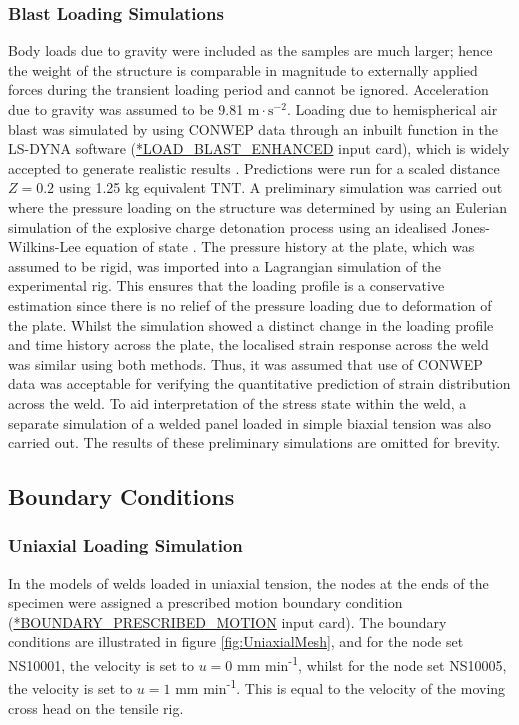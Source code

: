 \subsubsection{Blast Loading Simulations}
\label{FEBlastLoading}
Body loads due to gravity were included as the samples are much larger; hence the weight of the structure is comparable in magnitude to externally applied forces during the transient loading period and cannot be ignored. Acceleration due to gravity was assumed to be 9.81 $\text{m}\!\cdot\!\text{s}^{-2}$. 
Loading due to hemispherical air blast was simulated by using CONWEP data through an inbuilt function in the LS-DYNA software (\url{*LOAD_BLAST_ENHANCED} input card), which is widely accepted to generate realistic results \cite{Balden2005,Grujicic2007}. Predictions were run for a scaled distance $Z=0.2$ using 1.25 kg equivalent TNT. A preliminary simulation was carried out where the pressure loading on the structure was determined by using an Eulerian simulation of the explosive charge detonation process using an idealised Jones-Wilkins-Lee equation of state \cite{Luccioni2006,Grujicic2009a,Grujicic2011a}. The pressure history at the plate, which was assumed to be rigid, was imported into a Lagrangian simulation of the experimental rig. This ensures that the loading profile is a conservative estimation since there is no relief of the pressure loading due to deformation of the plate. Whilst the simulation showed a distinct change in the loading profile and time history across the plate, the localised strain response across the weld was similar using both methods. Thus, it was assumed that use of CONWEP data was acceptable for verifying the quantitative prediction of strain distribution across the weld. To aid interpretation of the stress state within the weld, a separate simulation of a welded panel loaded in simple biaxial tension was also carried out. The results of these preliminary simulations are omitted for brevity.
\subsection{Boundary Conditions}
\label{FEBoundaryConditions}
\subsubsection{Uniaxial Loading Simulation}
In the models of welds loaded in uniaxial tension, the nodes at the ends of the specimen were assigned a prescribed motion boundary condition (\url{*BOUNDARY_PRESCRIBED_MOTION} input card). The boundary conditions are illustrated in figure \ref{fig:UniaxialMesh}, and for the node set %
NS10001, the velocity is set to \textit{$u=0$} mm min\textsuperscript{-1}, whilst for the node set
NS10005, the velocity is set to \textit{$u=1$} mm min\textsuperscript{-1}. This is equal to the velocity of the moving cross head on the tensile rig.
